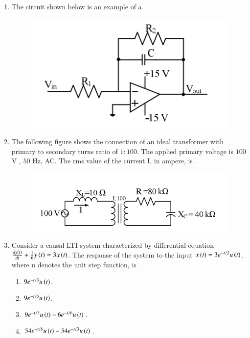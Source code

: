 \documentclass[journal,12pt,onecolumn]{IEEEtran}
\theoremstyle{remark}
\begin{document}
\begin{enumerate}[start=1, label=Q.\arabic*]
    \hfill{}

    \item The circuit shown below is an example of a
    \begin{figure}[H]
        \includegraphics[width=0.4\columnwidth]{Figures/2q2.png}
        \centering
        \caption{}
    \end{figure}
    \begin{enumerate}
    \end{enumerate}

    \hfill{}

    \item The following figure shows the connection of an ideal transformer with primary to secondary turns ratio of $1:100$. The applied primary voltage is $100$ V , $50$ Hz, AC. The rms value of the current I, in ampere, is \underline{\hspace{2cm}}.
    \begin{figure}[H]
        \includegraphics[width=0.4\columnwidth]{Figures/2q3.png}
        \centering
        \caption{}
    \end{figure}

    \hfill{}

    \item Consider a causal LTI system characterized by differential equation $\frac{dy\left(t\right)}{dt} + \frac{1}{6}y\left(t\right) = 3x\left(t\right)$. The response of the system to the input $x\left(t\right) = 3e^{-t/3}u\left(t\right)$, where u denotes the unit step function, is
    \begin{enumerate}
        \item $9e^{-t/3}u\left(t\right)$.
        \item $9e^{-t/6}u\left(t\right)$.
        \item $9e^{-t/3}u\left(t\right) - 6e^{-t/6}u\left(t\right)$.
        \item $54e^{-t/6}u\left(t\right) - 54e^{-t/3}u\left(t\right)$.
    \end{enumerate}


\end{enumerate}
\end{document}
